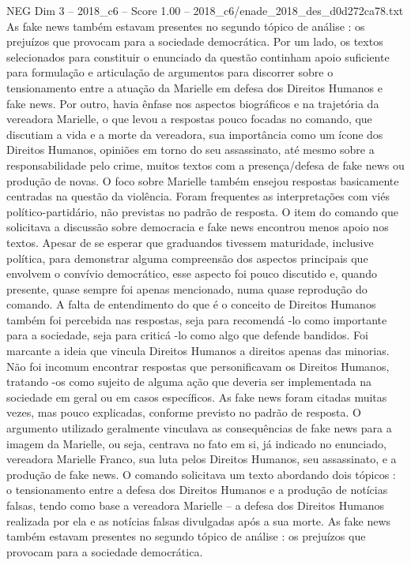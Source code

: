 \begin{textsample}{NEG Dim 3 – 2018\_c6 – Score 1.00 – 2018\_c6/enade\_2018\_des\_d0d272ca78.txt}
As fake news também estavam presentes no segundo tópico de análise : os prejuízos que provocam para a sociedade democrática.
Por um lado, os textos selecionados para constituir o enunciado da questão continham apoio suficiente para formulação e articulação de argumentos para discorrer sobre o tensionamento entre a atuação da Marielle em defesa dos Direitos Humanos e fake news.
Por outro, havia ênfase nos aspectos biográficos e na trajetória da vereadora Marielle, o que levou a respostas pouco focadas no comando, que discutiam a vida e a morte da vereadora, sua importância como um ícone dos Direitos Humanos, opiniões em torno do seu assassinato, até mesmo sobre a responsabilidade pelo crime, muitos textos com a presença/defesa de fake news ou produção de novas.
O foco sobre Marielle também ensejou respostas basicamente centradas na questão da violência.
Foram frequentes as interpretações com viés político-partidário, não previstas no padrão de resposta.
O item do comando que solicitava a discussão sobre democracia e fake news encontrou menos apoio nos textos.
Apesar de se esperar que graduandos tivessem maturidade, inclusive política, para demonstrar alguma compreensão dos aspectos principais que envolvem o convívio democrático, esse aspecto foi pouco discutido e, quando presente, quase sempre foi apenas mencionado, numa quase reprodução do comando.
A falta de entendimento do que é o conceito de Direitos Humanos também foi percebida nas respostas, seja para recomendá -lo como importante para a sociedade, seja para criticá -lo como algo que defende bandidos.
Foi marcante a ideia que vincula Direitos Humanos a direitos apenas das minorias.
Não foi incomum encontrar respostas que personificavam os Direitos Humanos, tratando -os como sujeito de alguma ação que deveria ser implementada na sociedade em geral ou em casos específicos.
As fake news foram citadas muitas vezes, mas pouco explicadas, conforme previsto no padrão de resposta.
O argumento utilizado geralmente vinculava as consequências de fake news para a imagem da Marielle, ou seja, centrava no fato em si, já indicado no enunciado, vereadora Marielle Franco, sua luta pelos Direitos Humanos, seu assassinato, e a produção de fake news.
O comando solicitava um texto abordando dois tópicos : o tensionamento entre a defesa dos Direitos Humanos e a produção de notícias falsas, tendo como base a vereadora Marielle – a defesa dos Direitos Humanos realizada por ela e as notícias falsas divulgadas após a sua morte.
As fake news também estavam presentes no segundo tópico de análise : os prejuízos que provocam para a sociedade democrática.

\end{textsample}
